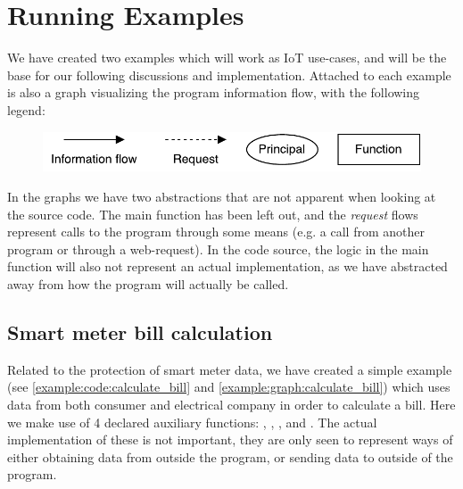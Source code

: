 
\section{Running Examples}\label{examples:sec}
We have created two examples which will work as IoT use-cases, and will be the base for our following discussions and implementation.
Attached to each example is also a graph visualizing the program information flow, with the following legend:
\begin{figure}[H]
  \centering
  \includegraphics[scale=0.8]{figures/dlm_legend}
\end{figure}
In the graphs we have two abstractions that are not apparent when looking at the source code.
The main function has been left out, and the \emph{request} flows represent calls to the program through some means (e.g. a call from another program or through a web-request).
In the code source, the logic in the main function will also not represent an actual implementation, as we have abstracted away from how the program will actually be called.

\subsection{Smart meter bill calculation}
Related to the protection of smart meter data, we have created a simple example (see \cref{example:code:calculate_bill} and \cref{example:graph:calculate_bill}) which uses data from both consumer and electrical company in order to calculate a bill.
Here we make use of 4 declared auxiliary functions: , , , and .
The actual implementation of these is not important, they are only seen to represent ways of either obtaining data from outside the program, or sending data to outside of the program.

